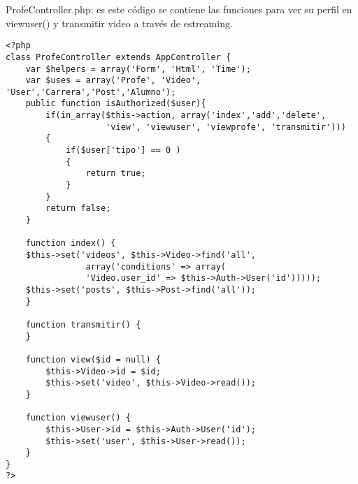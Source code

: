 \documentclass[12pt]{article}
\begin{document}
ProfeController.php: es este código se contiene las funciones para ver su perfil en viewuser() y transmitir
video a través de estreaming.\\
\footnotesize
\begin{verbatim}
<?php
class ProfeController extends AppController {
	var $helpers = array('Form', 'Html', 'Time');
	var $uses = array('Profe', 'Video', 'User','Carrera','Post','Alumno');
	public function isAuthorized($user){
		if(in_array($this->action, array('index','add','delete',
					'view', 'viewuser', 'viewprofe', 'transmitir')))
		{
			if($user['tipo'] == 0 )
			{
				return true;
			}
		}
		return false;
	}

	function index() {
	$this->set('videos', $this->Video->find('all',
				array('conditions' => array(
				'Video.user_id' => $this->Auth->User('id')))));
	$this->set('posts', $this->Post->find('all'));
	}

	function transmitir() {
	}

	function view($id = null) {
		$this->Video->id = $id;
		$this->set('video', $this->Video->read());
	}

	function viewuser() {
		$this->User->id = $this->Auth->User('id');
		$this->set('user', $this->User->read());	
	}
}
?>
\end{verbatim}
\end{document}
